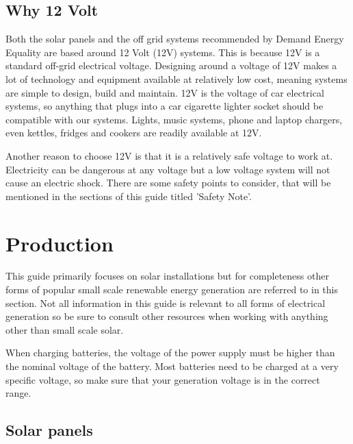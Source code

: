 \documentclass{article}
\theoremstyle{definition}
\theoremstyle{definition}
\theoremstyle{remark}
\begin{document}
  {\color{blue}\subsection{Why 12 Volt}} %
  \label{sub:why_12_volt}

    Both the solar panels and the off grid systems recommended by Demand Energy Equality are based around 12 Volt (12V) systems. This is because 12V is a standard off-grid electrical voltage. Designing around a voltage of 12V makes a lot of technology and equipment available at relatively low cost, meaning systems are simple to design, build and maintain. 12V is the voltage of car electrical systems, so anything that plugs into a car cigarette lighter socket should be compatible with our systems. Lights, music systems, phone and laptop chargers, even kettles, fridges and cookers are readily available at 12V. 

    Another reason to choose 12V is that it is a relatively safe voltage to work at. Electricity can be dangerous at any voltage but a low voltage system will not cause an electric shock. There are some safety points to consider, that will be mentioned in the sections of this guide titled 'Safety Note'.



{\color{blue}\section{Production}} %
\label{sec:production}

  This guide primarily focuses on solar installations but for completeness other forms of popular small scale renewable energy generation are referred to in this section. Not all information in this guide is relevant to all forms of electrical generation so be sure to consult other resources when working with anything other than small scale solar.

  When charging batteries, the voltage of the power supply must be higher than the nominal voltage of the battery. Most batteries need to be charged at a very specific voltage, so make sure that your generation voltage is in the correct range. 

  {\color{blue}\subsection{Solar panels}} %
  \label{sub:solar_panels}
\end{document}
